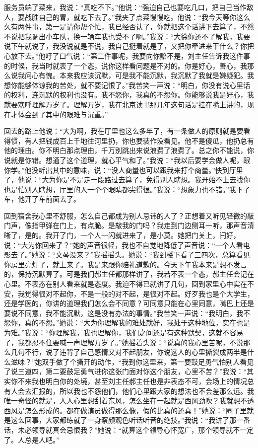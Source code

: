 \documentclass[12pt,oneside]{book}
\begin{document}
服务员端了菜来，我说：``真吃不下。''他说：``强迫自己也要吃几口，把自己当作敌人，要战胜自己的胃，就吃下去了。''我夹了点菜慢慢吃。他说：``我今天等你这么久有两件事，第一是请你帮个忙，我已经否认了，你就把这个话讲下去算了，不然不说把我调出小车队，换一辆车我也受不了啊。''我说：``大徐你还不了解我，我要说下午就说了，我没说就是不说，我自己挺着就是了，又把你牵进来干什么？你把心放下去。''他吁了口气说：``第二件事呢，我要向你赔不是，刘主任告诉我这件事的时候，我当时就表了一个态，说你这样看问题是不对的。你是好心，善心，我那么说我问心有愧。本来我应该沉默，可是我不能沉默，我沉默了我就是嫌疑犯。我想你能够体谅我的苦处，就不要记恨了。''我苦笑一声说：``明白，你没有说心里话的权利，连沉默的权利也没有。我不怨你，我真的不怨你。你能够说我是好心，我就要欢呼理解万岁了。理解万岁，我在北京读书那几年这句话是挂在嘴上讲的，现在才体会到了其中的艰难与沉重。''

回去的路上他说：``大为啊，我在厅里也这么多年了，有一条做人的原则就是要看得惯，有人把钱成百上千地往河里扔，你也要装作没看见。他不是傻瓜，他扔总有他的理由。你不明白那点理由，千万别跳出来说浪费了浪费了。总之你不能说，你说就是你错。想通了这个道理，就心平气和了。''我说：``我以后要学会做人呢，跟你学。''他没听出其中的意味，说：``没人商量也可以跟我来打个商量。''快到厅里了，他说：``大为你是不是走一段路过去算了，免得别人瞎想。我开始不上去找你也是怕别人瞎想，厅里的人一个个眼睛都尖得很。''我说：``想象力也不错。''我下了车，他开了车前面去了。

回到宿舍我心里不舒服，怎么自己都成为别人忌讳的人了？正想着又听见轻微的敲门声，像指甲弹在门上，有点脆。是敲我的门吗？我走到门边侧耳一听，那声音清晰了，是的。我开了门，一个人一闪就进来了，是小莫。她把门关上，闩好，说：``大为你回来了？''她的声音很轻，我也不自觉地降低了声音说：``一个人看电影去了。''她说：``文琴没来？''我摇摇头。她说：``我到楼下看了三四次，总算看见你房里亮灯了，就上来了。我是来跟你赔礼道歉的。今天下午我本来是想不发言的，保持沉默算了。可是我们郝主任都那样讲了，我若不表一个态，郝主任会记在心里。不表态在别人看来就是态度。我迫不得已就讲了几句，回到家里心中实在不安，我觉得很对不起你，不是一般的对不起，是很对不起。好歹我也是个大学生，还是学医的，你讲的道理我们怎么会不同意？可同意只能在心里同意，嘴巴上还是要说不同意，我不能沉默，这是没有办法的事情。''我苦笑一声说：``我明白，我不怨你，真的不怨。''她说：``大为你理解我的难处就好，我处于这种地位，实在也是为难。''我说：``你理解我，我也理解你，我们之间还是有这种默契，这就不容易了，我都忍不住要喊一声理解万岁了。''她摇着头说：``说真的我心里苦呢，不说那么几句不行，说了违背了自己感情又对不起朋友，你说这人的心里撕裂成两半是什么滋味？''她双手做了个撕开的动作，``我到你这里来，第一要鼓足勇气怕别人看见了说三道四，第二要鼓足勇气进你这张门面对你这个朋友，心里不苦？''我说：``其实你不来我也明白你的处境，甚至刘主任郝主任也是非表态不可，会场上的情况总有人会去汇报的，所以我也不怨他们，他们心里跟大家的想法也不会差那么远。我唯一奇怪的就是，人人心里想刮着东风，怎么坐在一起就是西风劲吹？我就想不透西风是怎么形成的。都在做演员做得那么像，假的比真的还真！''她说：``圈子里就是这么回事，大家都练就了一身察颜观色听话听音的绝技。''我说：``我讲了那一番话，未必领导就真会忌恨我？''她说：``就算这个领导心怀宽广，那个领导就不一定了。人总是人吧。''
\end{document}
